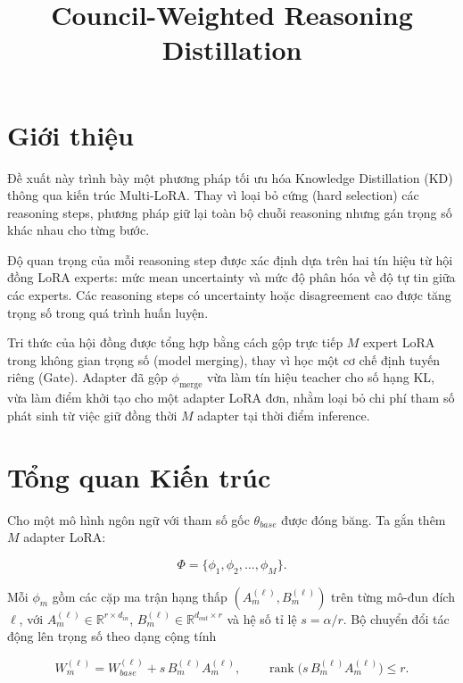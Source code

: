\documentclass[12pt,a4paper]{article}
\title{\textbf{Council-Weighted Reasoning Distillation}}
\author{}
\date{}
\DeclareMathOperator{\rank}{rank}
\newcommand{\pmerge}{\phi_{\mathrm{merge}}}
\begin{document}
\maketitle

\section{Giới thiệu}
Đề xuất này trình bày một phương pháp tối ưu hóa Knowledge Distillation (KD) thông qua kiến trúc Multi-LoRA. Thay vì loại bỏ cứng (hard selection) các reasoning steps, phương pháp giữ lại toàn bộ chuỗi reasoning nhưng gán trọng số khác nhau cho từng bước.

Độ quan trọng của mỗi reasoning step được xác định dựa trên hai tín hiệu từ hội đồng LoRA experts: mức mean uncertainty và mức độ phân hóa về độ tự tin giữa các experts. Các reasoning steps có uncertainty hoặc disagreement cao được tăng trọng số trong quá trình huấn luyện.

Tri thức của hội đồng được tổng hợp bằng cách gộp trực tiếp $M$ expert LoRA trong không gian trọng số (model merging), thay vì học một cơ chế định tuyến riêng (Gate). Adapter đã gộp $\pmerge$ vừa làm tín hiệu teacher cho số hạng KL, vừa làm điểm khởi tạo cho một adapter LoRA đơn, nhằm loại bỏ chi phí tham số phát sinh từ việc giữ đồng thời $M$ adapter tại thời điểm inference.

\section{Tổng quan Kiến trúc}

Cho một mô hình ngôn ngữ với tham số gốc $\theta_{base}$ được đóng băng. Ta gắn thêm $M$ adapter LoRA:

\begin{equation}
\Phi = \{\phi_1,\phi_2,\dots,\phi_M\}.
\end{equation}

Mỗi $\phi_m$ gồm các cặp ma trận hạng thấp $(A_m^{(\ell)}, B_m^{(\ell)})$ trên từng mô-đun đích $\ell$, với $A_m^{(\ell)} \in \mathbb{R}^{r\times d_{in}}$, $B_m^{(\ell)} \in \mathbb{R}^{d_{out}\times r}$ và hệ số tỉ lệ $s = \alpha/r$. Bộ chuyển đổi tác động lên trọng số theo dạng cộng tính

\begin{equation}
     \label{eq:lora}
     W^{(\ell)}_m = W^{(\ell)}_{base} + s\, B_m^{(\ell)} A_m^{(\ell)},
     \qquad
     \rank\!\big(s\, B_m^{(\ell)} A_m^{(\ell)}\big) \le r.
\end{equation}
\end{document}
